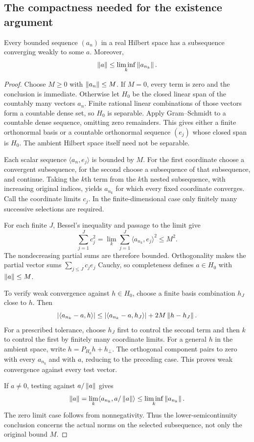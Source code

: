 \subsection{The compactness needed for the existence argument}
\begin{lemma}\label{lem:weak-subsequence}
Every bounded sequence $(a_n)$ in a real Hilbert space has a subsequence converging weakly to some $a$. Moreover,
\[
 \left\lVert a\right\rVert\le\liminf_k\left\lVert a_{n_k}\right\rVert.
\]
\end{lemma}
\begin{proof}
Choose $M\ge0$ with $\left\lVert a_n\right\rVert\le M$. If $M=0$, every term is zero and the conclusion is immediate. Otherwise let $H_0$ be the closed linear span of the countably many vectors $a_n$. Finite rational linear combinations of those vectors form a countable dense set, so $H_0$ is separable. Apply Gram--Schmidt to a countable dense sequence, omitting zero remainders. This gives either a finite orthonormal basis or a countable orthonormal sequence $(e_j)$ whose closed span is $H_0$. The ambient Hilbert space itself need not be separable.

Each scalar sequence $\langle a_n,e_j\rangle$ is bounded by $M$. For the first coordinate choose a convergent subsequence, for the second choose a subsequence of that subsequence, and continue. Taking the $k$th term from the $k$th nested subsequence, with increasing original indices, yields $a_{n_k}$ for which every fixed coordinate converges. Call the coordinate limits $c_j$. In the finite-dimensional case only finitely many successive selections are required.

For each finite $J$, Bessel's inequality and passage to the limit give
\[
 \sum_{j=1}^Jc_j^2
 =\lim_k\sum_{j=1}^J\langle a_{n_k},e_j\rangle^2\le M^2.
\]
The nondecreasing partial sums are therefore bounded. Orthogonality makes the partial vector sums $\sum_{j\le J}c_je_j$ Cauchy, so completeness defines $a\in H_0$ with $\left\lVert a\right\rVert\le M$.

To verify weak convergence against $h\in H_0$, choose a finite basis combination $h_J$ close to $h$. Then
\[
 |\langle a_{n_k}-a,h\rangle|
 \le |\langle a_{n_k}-a,h_J\rangle|
      +2M\left\lVert h-h_J\right\rVert.
\]
For a prescribed tolerance, choose $h_J$ first to control the second term and then $k$ to control the first by finitely many coordinate limits. For a general $h$ in the ambient space, write $h=P_{H_0}h+h_\perp$. The orthogonal component pairs to zero with every $a_{n_k}$ and with $a$, reducing to the preceding case. This proves weak convergence against every test vector.

If $a\ne0$, testing against $a/\left\lVert a\right\rVert$ gives
\[
 \left\lVert a\right\rVert=\lim_k\langle a_{n_k},a/\left\lVert a\right\rVert\rangle
 \le\liminf_k\left\lVert a_{n_k}\right\rVert.
\]
The zero limit case follows from nonnegativity. Thus the lower-semicontinuity conclusion concerns the actual norms on the selected subsequence, not only the original bound $M$.
\end{proof}

